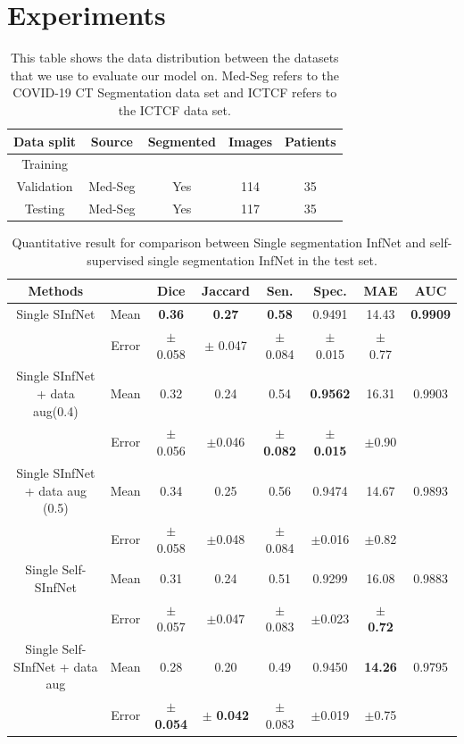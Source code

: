 \section{Experiments}

\begin{table}[!h]
	\centering
	\begin{tabular}{|c||c|c|c|c|} \hline
		Data split & Source & Segmented & Images & Patients \\\hline
		Training & \vtop{\hbox{\strut Med-Seg}\hbox{\strut ICTCF}}&
		\vtop{\hbox{\strut Yes}\hbox{\strut No}} & 
		\vtop{\hbox{\strut 698}\hbox{\strut 6654}}&
		\vtop{\hbox{\strut 39}\hbox{\strut 1338}}\\\hline
		Validation & Med-Seg & Yes & 114 & 35 \\\hline
		Testing & Med-Seg & Yes & 117 & 35 \\\hline
	\end{tabular}
	\caption{This table shows the data distribution between the datasets that we use to evaluate our model on. Med-Seg refers to the COVID-19 CT Segmentation data set and ICTCF refers to the ICTCF data set.}
	\label{tab:dataset}
\end{table}

\begin{table}[!h]
	\centering
	\begin{tabular}{| c | c || c c c c c | c ||}
		\hline
		Methods & & Dice & Jaccard & Sen. & Spec. & MAE & AUC \\ \hline
		Single SInfNet &  Mean & \textbf{0.36} & \textbf{0.27} & \textbf{0.58} & 0.9491 & 14.43 & \textbf{0.9909} \\ \cline{2-7}
		& Error & $\pm$ 0.058 & $\pm$ 0.047 & $\pm$0.084 & $\pm$ 0.015 & $\pm$ 0.77 & \\ \hline
		Single SInfNet + data aug(0.4) &  Mean & 0.32 & 0.24 & 0.54 & \textbf{0.9562} & 16.31 & 0.9903 \\ \cline{2-7}
		& Error & $\pm$0.056  & $\pm$0.046  &$\pm$\textbf{0.082} &$\pm$\textbf{0.015} &$\pm$0.90 & \\ \hline
		Single SInfNet + data aug (0.5) &  Mean & 0.34 & 0.25 & 0.56 & 0.9474 & 14.67 & 0.9893 \\ \cline{2-7}
		& Error &$\pm$0.058 &$\pm$0.048 &$\pm$0.084 &$\pm$0.016 & $\pm$0.82 & \\ \hline \hline
		Single Self-SInfNet &  Mean & 0.31 & 0.24 & 0.51 & 0.9299 & 16.08 & 0.9883  \\ \cline{2-7}
		& Error & $\pm$0.057 & $\pm$0.047 &$\pm$0.083  & $\pm$0.023 & $\pm$ \textbf{0.72} & \\ \hline
		Single Self-SInfNet + data aug &  Mean & 0.28 & 0.20 & 0.49 & 0.9450 &  \textbf{14.26} & 0.9795 \\ \cline{2-7}
		& Error & $\pm$ \textbf{0.054}  & $\pm$ \textbf{0.042} & $\pm$ 0.083 & $\pm$0.019 & $\pm$0.75 & \\ \hline
	\end{tabular}
	\caption{Quantitative result for comparison between Single segmentation InfNet and self-supervised single segmentation InfNet in the test set.}
	\label{tab:single}
\end{table}

